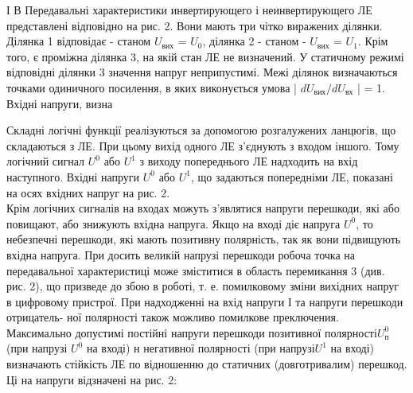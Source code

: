 \documentclass[a4paper,14pt]{extreport}
\begin{document}
  І В Передавальні характеристики инвертирующего і неинвертирующего ЛЕ представлені відповідно на рис. 2. Вони мають три чітко виражених ділянки. Ділянка 1 відповідає - станом $U_{\text{вих}}$ = $U_0$, ділянка 2 - станом - $U_{\text {вих}}$ = $U_1$. Крім того, є проміжна ділянка 3, на якій стан ЛЕ не визначений. У статичному режимі відповідні ділянки 3 значення напруг неприпустимі. Межі ділянок визначаються точками одиничного посилення, в яких виконується умова |
   $ dU_{\text{вих}}/dU_{\text{вх}}$ | = 1. Вхідні напруги, визна
  \begin{figure}[!h]
  \end{figure}

  Складні логічні функції реалізуються за допомогою розгалужених ланцюгів, що складаються з ЛЕ. При цьому вихід одного ЛЕ з'єднують з
  входом іншого. Тому логічний сигнал $U^0$ або $U^1$ з виходу
  попереднього ЛЕ надходить на вхід наступного. Вхідні напруги $U^0$ або $U^1$, що задаються попередніми ЛЕ, показані на осях вхідних напруг на рис. 2.\\

  Крім логічних сигналів на входах можуть з'являтися напруги перешкоди, які або повищают, або знижують вхідна напруга. Якщо на вході діє напруга $U^0$, то небезпечні перешкоди, які мають позитивну полярність, так як вони підвищують вхідна напруга. При досить великій напрузі перешкоди робоча точка на передавальної характеристиці може зміститися в область
  перемикання 3 (див. рис. 2), що призведе до збою в роботі, т. е. помилковому зміни вихідних напруг в цифровому пристрої. При надходженні на вхід напруги І та напруги перешкоди отрицатель-
  ної полярності також можливо помилкове преключения. Максимально допустимі постійні напруги перешкоди позитивної полярності$U_{\text{п}}^0$ (при напрузі $U^0$ на вході) н негативної полярності (при напрузі$U^1$ на вході) визначають стійкість ЛЕ по
  відношенню до статичних (довготривалим) перешкод. Ці на напруги відзначені на рис. 2:
\end{document}
